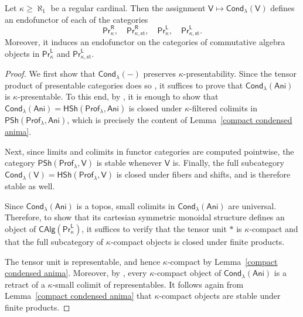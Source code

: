 \begin{proposition}\label{Cond preserves presentability}
    Let $\kappa\geq \aleph_1$ be a regular cardinal. Then the assignment $\mathsf{V}\mapsto \mathsf{Cond}_\lambda(\mathsf{V})$ defines an endofunctor of each of the categories 
    \[\mathsf{Pr}^\mathsf{R}_{\kappa}, \quad \mathsf{Pr}^\mathsf{R}_{\kappa,\mathrm{st}}, \quad \mathsf{Pr}^\mathsf{L}_{\kappa}, \quad\mathsf{Pr}^\mathsf{L}_{\kappa,\mathrm{st}}.\]
    Moreover, it induces an endofunctor on the categories of commutative algebra objects in $\mathsf{Pr}^\mathsf{L}_{\kappa}$ and $\mathsf{Pr}^\mathsf{L}_{\kappa,\mathrm{st}}$.
\end{proposition}

\begin{proof}
We first show that $\mathsf{Cond}_\lambda(-)$ preserves $\kappa$-presentability. Since the tensor product of presentable categories does so \cite[Lem.~5.3.2.11]{higheralgebra}, it suffices to prove that $\mathsf{Cond}_\lambda(\mathsf{Ani})$ is $\kappa$-presentable. To this end, by \cite[Cor.~5.5.7.3]{lurie2009HTT}, it is enough to show that $\mathsf{Cond}_\lambda(\mathsf{Ani}) = \mathsf{HSh}(\mathsf{Prof}_\lambda,\mathsf{Ani})$ is closed under $\kappa$-filtered colimits in $\mathsf{PSh}(\mathsf{Prof}_\lambda,\mathsf{Ani})$, which is precisely the content of Lemma~\ref{compact condensed anima}. 

Next, since limits and colimits in functor categories are computed pointwise, the category $\mathsf{PSh}(\mathsf{Prof}_\lambda,\mathsf{V})$ is stable whenever $\mathsf{V}$ is. Finally, the full subcategory $\mathsf{Cond}_\lambda(\mathsf{V}) = \mathsf{HSh}(\mathsf{Prof}_\lambda,\mathsf{V})$ is closed under fibers and shifts, and is therefore stable as well.

Since $\mathsf{Cond}_{\lambda}(\mathsf{Ani})$ is a topos, small colimits in $\mathsf{Cond}_{\lambda}(\mathsf{Ani})$ are universal. Therefore, to show that its cartesian symmetric monoidal structure defines an object of $\mathsf{CAlg}(\mathsf{Pr}^{\mathsf{L}}_{\kappa})$, it suffices to verify that the tensor unit $\ast$ is $\kappa$-compact and that the full subcategory of $\kappa$-compact objects is closed under finite products.

The tensor unit is representable, and hence $\kappa$-compact by Lemma~\ref{compact condensed anima}. Moreover, by \cite[Prop.~5.3.4.17 and Cor.~5.5.7.3]{lurie2009HTT}, every $\kappa$-compact object of $\mathsf{Cond}_{\lambda}(\mathsf{Ani})$ is a retract of a $\kappa$-small colimit of representables. It follows again from Lemma~\ref{compact condensed anima} that $\kappa$-compact objects are stable under finite products.


\end{proof}

